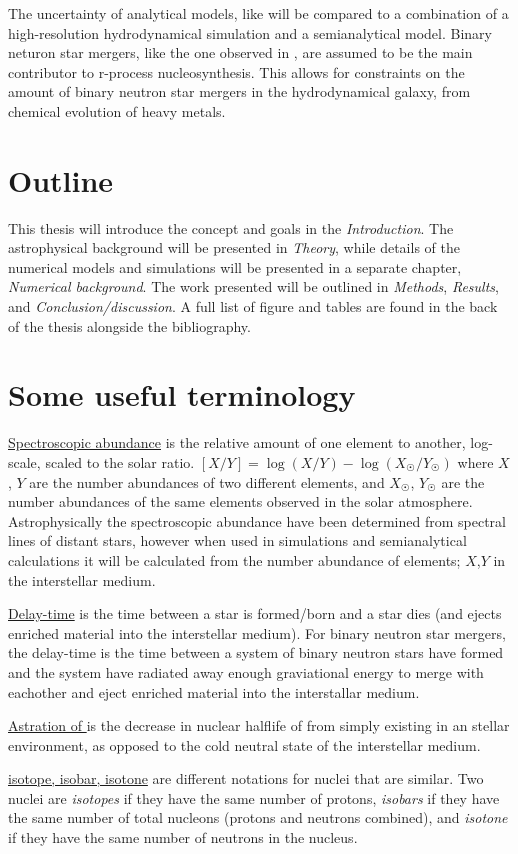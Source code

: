 The uncertainty of analytical models, like  will be compared to a combination of a high-resolution hydrodynamical simulation and a semianalytical model.
Binary neturon star mergers, like the one observed in , are assumed to be the main contributor to r-process nucleosynthesis.
This allows for constraints on the amount of binary neutron star mergers in the hydrodynamical galaxy, from chemical evolution of heavy metals.

\section{Outline}
This thesis will introduce the concept and goals in the \textit{Introduction}.
The astrophysical background will be presented in \textit{Theory}, while details of the numerical models and simulations will be presented in a separate chapter, \textit{Numerical background}.
The work presented will be outlined in \textit{Methods}, \textit{Results}, and \textit{Conclusion/discussion}.
A full list of figure and tables are found in the back of the thesis alongside the bibliography.

\section{Some useful terminology}
\underline{Spectroscopic abundance} is the relative amount of one element to another, log-scale, scaled to the solar ratio.
$[X/Y] = \log\left(X / Y\right) - \log\left( X_{\astrosun}/Y_{\astrosun}\right)$
where $X$, $Y$ are the number abundances of two different elements, and $X_{\astrosun}$, $Y_{\astrosun}$ are the number abundances of the same elements observed in the solar atmosphere.
Astrophysically the spectroscopic abundance have been determined from spectral lines of distant stars, however when used in simulations and semianalytical calculations it will be calculated from the number abundance of elements; $X$,$Y$ in the interstellar medium.

\underline{Delay-time} is the time between a star is formed/born and a star dies (and ejects enriched material into the interstellar medium).
For binary neutron star mergers, the delay-time is the time between a system of binary neutron stars have formed and the system have radiated away enough graviational energy to merge with eachother and eject enriched material into the interstallar medium.

\underline{Astration of } is the decrease in nuclear halflife of  from simply existing in an stellar environment, as opposed to the cold neutral state of the interstellar medium.

\underline{isotope, isobar, isotone} are different notations for nuclei that are similar. Two nuclei are \textit{isotopes} if they have the same number of protons, \textit{isobars} if they have the same number of total nucleons (protons and neutrons combined), and \textit{isotone} if they have the same number of neutrons in the nucleus.

